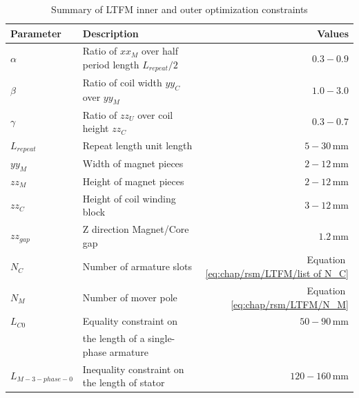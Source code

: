     
                \begin{table}[h]
                    \renewcommand{\arraystretch}{1.2}
                    \caption{Summary of \acs{LTFM} inner and outer optimization constraints}
                    \label{table:chap/rsm/LTFM/inner and outer constraints}
                    \centering
                    \begin{tabular}{@{}llr@{}}
                    \hline
                    \bfseries Parameter & \bfseries Description & \bfseries Values\\
                    \hline
                        $\alpha$	    & Ratio of $xx_M$ over half period length $L_{repeat}/2$  &	$0.3-0.9$\\ 
                        $\beta$	        & Ratio of coil width $yy_C$ over $yy_M$	&	$1.0-3.0$\\ 
                        $\gamma$	    & Ratio of $zz_U$ over coil height	$zz_C$	&	$0.3-0.7$\\ 
                        $L_{repeat}$    & Repeat length unit length                 &   $5-30\,\mathrm{mm}$\\
                        $yy_M$	        & Width of magnet pieces 	                &	$2-12\,\mathrm{mm}$\\ 
                        $zz_M$	        & Height of magnet pieces			        &	$2-12\,\mathrm{mm}$\\ 
                        $zz_C$	        & Height of coil winding block 			    &	$3-12\,\mathrm{mm}$\\ 
                        $zz_{gap}$      & Z direction Magnet/Core gap               &	$1.2\,\mathrm{mm}$\\ 
                        \hline
                        $N_C$	        & Number of armature slots 		            &	Equation\,\,\ref{eq:chap/rsm/LTFM/list of N_C} \\ 
                        $N_M$	        & Number of mover pole 		                &	Equation\,\,\ref{eq:chap/rsm/LTFM/N_M}\\ 
                        $L_{C0}$	    & Equality constraint on 		            &	$50-90\,\mathrm{mm}$\\ 
                                        & \quad the length of a single-phase armature       &   \\
                        $L_{M-3-phase-0}$	    & Inequality constraint on the length of stator &	$120-160\,\mathrm{mm}$\\
                    \hline
                    \end{tabular}
                \end{table}
    
